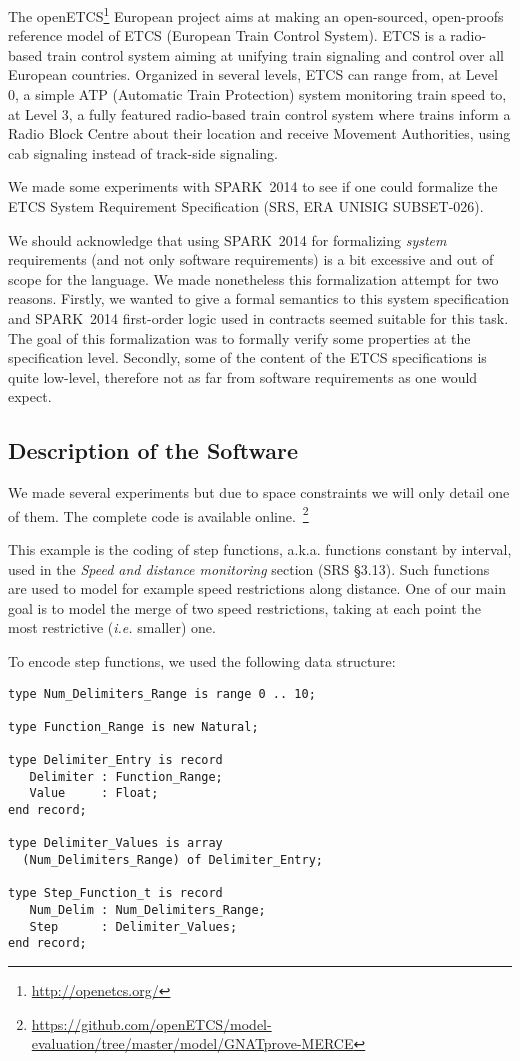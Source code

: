 \documentclass[10pt,a4paper,twocolumn]{article}
\newcommand{\openetcs}{openETCS\xspace}
\newcommand{\newspark}{SPARK~2014\xspace}
\newcommand{\ie}{\textit{i.e.}\xspace}
\newcommand{\aka}{a.k.a.\xspace}
\begin{document}

The \openetcs\footnote{\url{http://openetcs.org/}} European project
aims at making an open-sourced, open-proofs reference model of ETCS
(European Train Control System). ETCS is a radio-based train control
system aiming at unifying train signaling and control over all
European countries. Organized in several levels, ETCS can range from,
at Level 0, a simple ATP (Automatic Train Protection) system
monitoring train speed to, at Level 3, a fully featured radio-based
train control system where trains inform a Radio Block Centre about
their location and receive Movement Authorities, using cab signaling
instead of track-side signaling.

We made some experiments with \newspark to see if one could formalize
the ETCS System Requirement Specification (SRS, ERA UNISIG
SUBSET-026).

We should acknowledge that using \newspark for formalizing
\emph{system} requirements (and not only software requirements) is a
bit excessive and out of scope for the language. We made nonetheless
this formalization attempt for two reasons. Firstly, we wanted to give
a formal semantics to this system specification and \newspark
first-order logic used in contracts seemed suitable for
this task. The goal of this formalization was to formally verify some
properties at the specification level.  Secondly, some of
the content of the ETCS specifications is quite low-level, therefore
not as far from software requirements as one would expect.

\subsection{Description of the Software}

We made several experiments but due to space constraints we will only detail
one of them. The complete code is available
online.~\footnote{\url{https://github.com/openETCS/model-evaluation/tree/master/model/GNATprove-MERCE}}

This example is the coding of step functions, \aka functions
constant by interval, used in the \textit{Speed and distance monitoring}
section (SRS §3.13). Such functions are used to model for example
speed restrictions along distance. One of our main goal is to model
the merge of two speed restrictions, taking at each point the most
restrictive (\ie smaller) one.

To encode step functions, we used the following data structure:
\begin{lstlisting}
type Num_Delimiters_Range is range 0 .. 10;

type Function_Range is new Natural;

type Delimiter_Entry is record
   Delimiter : Function_Range;
   Value     : Float;
end record;

type Delimiter_Values is array
  (Num_Delimiters_Range) of Delimiter_Entry;

type Step_Function_t is record
   Num_Delim : Num_Delimiters_Range;
   Step      : Delimiter_Values;
end record;
\end{lstlisting}
\end{document}
